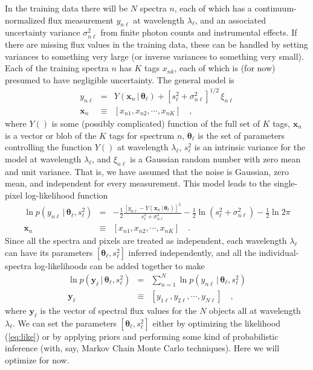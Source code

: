 \documentclass[12pt, preprint]{aastex}
\newcommand{\set}[1]{\bm{#1}}
\newcommand{\given}{\,|\,}
\begin{document}
In the training data there will be $N$ spectra $n$, each of which has
a continuum-normalized flux measurement $y_{n\ell}$ at wavelength
$\lambda_\ell$, and an associated uncertainty variance
$\sigma_{n\ell}^2$ from finite photon counts and instrumental effects.
If there are missing flux values in the training data, these can be
handled by setting variances to something very large (or inverse
variances to something very small).
Each of the training spectra $n$ has $K$ tags $x_{nk}$, each of which
is (for now) presumed to have negligible uncertainty.
The general model is
\begin{eqnarray}
y_{n\ell} &=&
 Y(\set{x}_n\given\set{\theta}_\ell) + [s_\ell^2 + \sigma_{n\ell}^2]^{1/2}\,\xi_{n\ell}
\label{eq:model}\\
\set{x}_n &\equiv& [x_{n1}, x_{n2}, \cdots, x_{nK}]
\quad,
\end{eqnarray}
where $Y()$ is some (possibly complicated) function of the full set
of $K$ tags, $\set{x}_n$ is a vector or blob of the $K$ tags for spectrum $n$,
$\set{\theta}_\ell$ is the set of parameters controlling the
function $Y()$ at wavelength $\lambda_\ell$, $s_\ell^2$ is an
intrinsic variance for the model at wavelength $\lambda_\ell$, and
$\xi_{n\ell}$ is a Gaussian random number with zero mean and unit
variance.
That is, we have assumed that the noise is Gaussian, zero mean, and
independent for every measurement.
This model leads to the single-pixel log-likelihood function
\begin{eqnarray}
\ln p(y_{n\ell}\given\set{\theta}_\ell,s_\ell^2) &=&
 -\frac{1}{2}\frac{[y_{n\ell} - Y(\set{x}_n\given\set{\theta}_\ell)]^2}{s_\ell^2 + \sigma_{n\ell}^2}
 -\frac{1}{2}\ln(s_\ell^2 + \sigma_{n\ell}^2)
 -\frac{1}{2}\ln 2\pi
\label{eq:like1}\\
\set{x}_n &\equiv& [x_{n1}, x_{n2}, \cdots, x_{nK}]
\quad.
\end{eqnarray}
Since all the spectra and pixels are treated as independent, each
wavelength $\lambda_\ell$ can have its parameters
$[\set{\theta}_\ell,s_\ell^2]$ inferred independently, and all the
individual-spectra log-likelihoods can be added together to make
\begin{eqnarray}
\ln p(\set{y}_\ell\given\set{\theta}_\ell,s_\ell^2) &=&
 \sum_{n=1}^N \ln p(y_{n\ell}\given\set{\theta}_\ell,s_\ell^2)
\label{eq:like}\\
\set{y}_\ell &\equiv& [y_{1\ell}, y_{2\ell}, \cdots, y_{N\ell}]
\quad,
\end{eqnarray}
where $\set{y}_\ell$ is the vector of spectral flux values for
the $N$ objects all at wavelength $\lambda_\ell$.
We can set the parameters $[\set{\theta}_\ell,s_\ell^2]$ either by
optimizing the likelihood (\ref{eq:like}) or by applying priors and
performing some kind of probabilistic inference (with, say, Markov
Chain Monte Carlo techniques).
Here we will optimize for now.
\end{document}
